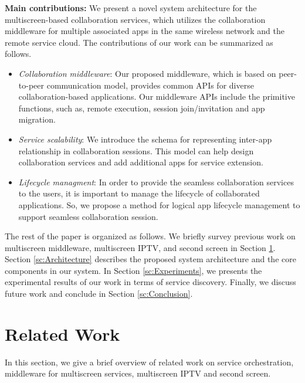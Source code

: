 \documentclass[conference]{IEEEtran}
\newcommand{\bi}{\begin{itemize}}
\newcommand{\ei}{\end{itemize}}
\newcommand{\ii}{\item}
\begin{document}
\noindent
\textbf{Main contributions:} We present a novel system architecture for the multiscreen-based collaboration services, which utilizes the collaboration middleware for multiple associated apps in the same wireless network and the remote service cloud. The contributions of our work can be summarized as follows.
\bi
\ii \textit{Collaboration middleware}: 
Our proposed middleware, which is based on peer-to-peer communication model, provides common APIs for diverse collaboration-based applications. Our middleware APIs include the primitive functions, such as, remote execution, session join/invitation and app migration.
\ii \textit{Service scalability}: 
We introduce the schema for representing inter-app relationship in collaboration sessions. This model can help design collaboration services and add additional apps for service extension. 
\ii \textit{Lifecycle managment}: In order to provide the seamless collaboration services to the users, it is important to manage the lifecycle of  collaborated applications.  So, we propose a method for logical app lifecycle management  to  support seamless collaboration session.
\ei

The rest of the paper is organized as follows.
We briefly survey previous work on multiscreen middleware, multiscreen IPTV, and second screen in Section \ref{sc:RelatedWork}.
Section \ref{sc:Architecture} describes the proposed system architecture and the core components in our system.
In Section \ref{sc:Experiments}, we  presents the experimental results of our work in terms of service discovery.
Finally, we discuss future work and conclude in Section \ref{sc:Conclusion}.

\section{Related Work}
\label{sc:RelatedWork}
In this section, we give a brief overview of related work on service orchestration, middleware for multiscreen services, multiscreen IPTV and second screen.\\ 
\end{document}

